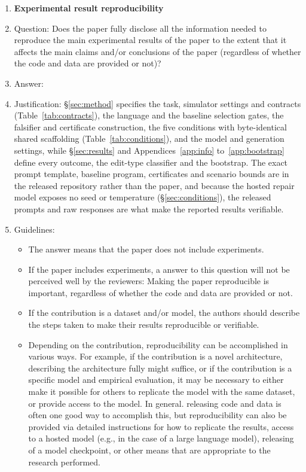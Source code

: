 \begin{enumerate}
\item {\bf Experimental result reproducibility}
    \item[] Question: Does the paper fully disclose all the information needed to reproduce the main experimental results of the paper to the extent that it affects the main claims and/or conclusions of the paper (regardless of whether the code and data are provided or not)?
    \item[] Answer: \answerYes{}
    \item[] Justification: \S\ref{sec:method} specifies the task, simulator settings and contracts (Table~\ref{tab:contracts}), the language and the baseline selection gates, the falsifier and certificate construction, the five conditions with byte-identical shared scaffolding (Table~\ref{tab:conditions}), and the model and generation settings, while \S\ref{sec:results} and Appendices~\ref{app:info} to~\ref{app:bootstrap} define every outcome, the edit-type classifier and the bootstrap. The exact prompt template, baseline program, certificates and scenario bounds are in the released repository rather than the paper, and because the hosted repair model exposes no seed or temperature (\S\ref{sec:conditions}), the released prompts and raw responses are what make the reported results verifiable.
    \item[] Guidelines:
    \begin{itemize}
        \item The answer \answerNA{} means that the paper does not include experiments.
        \item If the paper includes experiments, a \answerNo{} answer to this question will not be perceived well by the reviewers: Making the paper reproducible is important, regardless of whether the code and data are provided or not.
        \item If the contribution is a dataset and/or model, the authors should describe the steps taken to make their results reproducible or verifiable.
        \item Depending on the contribution, reproducibility can be accomplished in various ways. For example, if the contribution is a novel architecture, describing the architecture fully might suffice, or if the contribution is a specific model and empirical evaluation, it may be necessary to either make it possible for others to replicate the model with the same dataset, or provide access to the model. In general. releasing code and data is often one good way to accomplish this, but reproducibility can also be provided via detailed instructions for how to replicate the results, access to a hosted model (e.g., in the case of a large language model), releasing of a model checkpoint, or other means that are appropriate to the research performed.

\end{itemize}
\end{enumerate}
